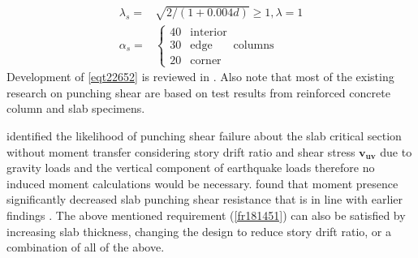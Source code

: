 \documentclass[twocolumn]{article} %
\begin{document}
\begin{equation}\nonumber\begin{array}{rl}
\lambda_s =& \sqrt{{2}/({1+0.004d})}\ge1, \lambda = 1\\
\alpha_s =&\left\{\begin{array}{ll}40&\mathrm{interior}\\ 30& \mathrm{edge}\\20&\mathrm{corner}\end{array}\right.\,\mathrm{columns}
\end{array}
\end{equation}
Development of \ref{eqt22652} is reviewed in \cite{bayrak2009two}. Also note that most of the existing research on punching shear are based on test results from reinforced concrete column and slab specimens.



\cite{megally2002,moehle1996,kang2006,kang2007} identified the likelihood of punching shear failure about the slab critical section without moment transfer considering story drift ratio and shear stress $\mathbf{v_{uv}}$ due to gravity loads and the vertical component of earthquake loads therefore no induced moment calculations would be necessary. \cite{megally2000,kang2009nonlinear,moreno2008punching,song2012effective,kruger1998punching,krueger1999influence} found that moment presence significantly decreased slab punching shear resistance  that is in line with earlier findings \citep{hawkins1974,islam1976}. The above mentioned requirement (\ref{fr181451}) can also be satisfied by increasing slab thickness, changing the design to reduce story drift ratio, or a combination of all of the above. 
    
\end{document}
